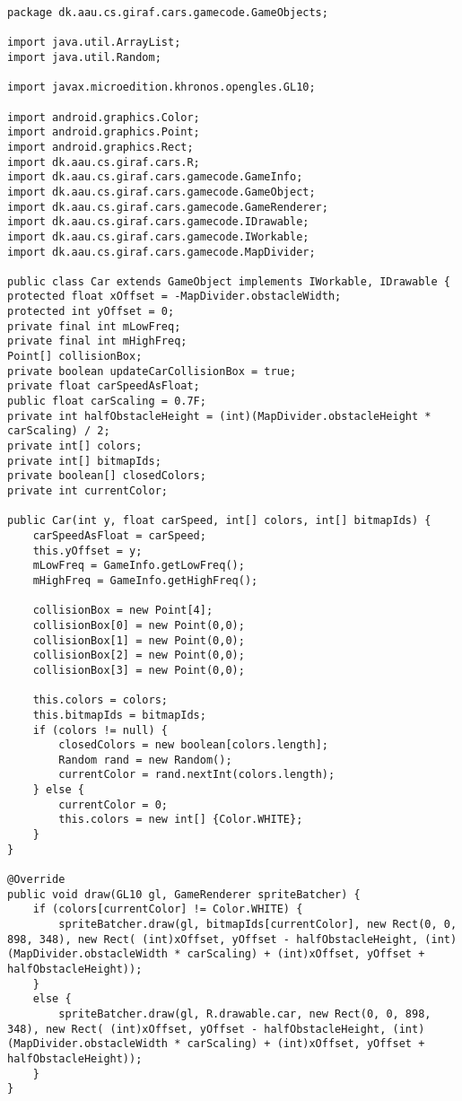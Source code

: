 \begin{lstlisting}[style=csharp,label=car_class, caption={Run method from the original Cars project.}]
package dk.aau.cs.giraf.cars.gamecode.GameObjects;

import java.util.ArrayList;
import java.util.Random;

import javax.microedition.khronos.opengles.GL10;

import android.graphics.Color;
import android.graphics.Point;
import android.graphics.Rect;
import dk.aau.cs.giraf.cars.R;
import dk.aau.cs.giraf.cars.gamecode.GameInfo;
import dk.aau.cs.giraf.cars.gamecode.GameObject;
import dk.aau.cs.giraf.cars.gamecode.GameRenderer;
import dk.aau.cs.giraf.cars.gamecode.IDrawable;
import dk.aau.cs.giraf.cars.gamecode.IWorkable;
import dk.aau.cs.giraf.cars.gamecode.MapDivider;

public class Car extends GameObject implements IWorkable, IDrawable {
protected float xOffset = -MapDivider.obstacleWidth;
protected int yOffset = 0;
private final int mLowFreq;
private final int mHighFreq;
Point[] collisionBox;
private boolean updateCarCollisionBox = true;
private float carSpeedAsFloat;
public float carScaling = 0.7F;
private int halfObstacleHeight = (int)(MapDivider.obstacleHeight * carScaling) / 2;
private int[] colors;
private int[] bitmapIds;
private boolean[] closedColors;
private int currentColor;
	
public Car(int y, float carSpeed, int[] colors, int[] bitmapIds) {
	carSpeedAsFloat = carSpeed;
	this.yOffset = y;
	mLowFreq = GameInfo.getLowFreq();
	mHighFreq = GameInfo.getHighFreq();
		
	collisionBox = new Point[4];
	collisionBox[0] = new Point(0,0);
	collisionBox[1] = new Point(0,0);
	collisionBox[2] = new Point(0,0);
	collisionBox[3] = new Point(0,0);
	
	this.colors = colors;
	this.bitmapIds = bitmapIds;
	if (colors != null) {
		closedColors = new boolean[colors.length];
		Random rand = new Random();
		currentColor = rand.nextInt(colors.length);
	} else {
		currentColor = 0;
		this.colors = new int[] {Color.WHITE};
	}		
}
	
@Override
public void draw(GL10 gl, GameRenderer spriteBatcher) {
	if (colors[currentColor] != Color.WHITE) {
		spriteBatcher.draw(gl, bitmapIds[currentColor], new Rect(0, 0, 898, 348), new Rect( (int)xOffset, yOffset - halfObstacleHeight, (int)(MapDivider.obstacleWidth * carScaling) + (int)xOffset, yOffset + halfObstacleHeight));
	}
	else {
		spriteBatcher.draw(gl, R.drawable.car, new Rect(0, 0, 898, 348), new Rect( (int)xOffset, yOffset - halfObstacleHeight, (int)(MapDivider.obstacleWidth * carScaling) + (int)xOffset, yOffset + halfObstacleHeight));
	}
}


\end{lstlisting}
